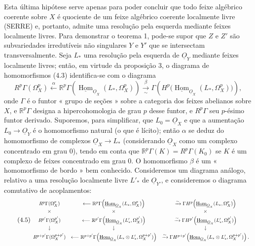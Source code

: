 \documentclass[11pt,twoside,openany]{book}
\numberwithin{equation}{section}
\newcommand{\Osh}{\underline{O}}
\newcommand{\Homsh}{\underline{\operatorname{Hom}}}
\theoremstyle{plain}
\theoremstyle{definition}
\theoremstyle{remark}
\begin{document}
Esta última hipótese serve apenas para poder concluir que todo
feixe algébrico coerente sobre $X$ é quociente de um feixe algébrico
coerente localmente livre (SERRE) e, portanto, admite uma resolução pela esquerda mediante
feixes localmente livres. Para demonstrar o teorema 1, pode-se supor que
$Z$ e $Z'$ são subvariedades irredutíveis não singulares $Y$ e $Y'$ que se
intersectam transversalmente. Seja $L_{*}$ uma resolução pela esquerda de $\Osh_Y$ mediante
feixes localmente livres; então, em virtude da proposição 3, o diagrama
de homomorfismos (4.3) identifica-se com o diagrama
\[
R^{p}\Gamma(\Omega_X^{p})
\xleftarrow{\alpha}
\mathbb R^{p}\Gamma\!\left(\Homsh_{\Osh_X}(L_{*},\Omega_X^{p})\right)
\xrightarrow[\sim]{\beta}
\Gamma\!\left(H^{p}\bigl(\Homsh_{\Osh_X}(L_{*},\Omega_X^{p})\bigr)\right),
\]
onde $\Gamma$ é o funtor « grupo de seções » sobre a categoria dos
feixes abelianos sobre $X$, e $\mathbb R^{p}\Gamma$ designa
a hipercohomologia de grau $p$ desse funtor, e $R^{p}\Gamma$ seu
$p$-ésimo funtor derivado. Suporemos, para simplificar, que $L_0=\Osh_X$ e que
a aumentação $L_0\longrightarrow\Osh_Y$ é o homomorfismo natural (o que
é lícito); então $\alpha$ se deduz do homomorfismo de complexos
$\Osh_X\longrightarrow L_{*}$ (considerando $\Osh_X$ como um complexo concentrado
em grau $0$), tendo em conta que $\mathbb R^{p}\Gamma(K)=R^{p}\Gamma(K_0)$ se $K$
é um complexo de feixes concentrado em grau $0$. O homomorfismo $\beta$ é um
« homomorfismo de bordo » bem conhecido. Consideremos um diagrama análogo, relativo a
uma resolução localmente livre $L'_{*}$ de $\Osh_{Y'}$, e consideremos o
diagrama comutativo de acoplamentos:
\begin{equation}\tag{4.5}
\resizebox{\textwidth}{!}{$
\begin{array}{ccc}
R^{p}\Gamma(\Omega_X^{p})
&\longleftarrow
\mathbb R^{p}\Gamma\!\left(\Homsh_{\Osh_X}(L_{*},\Omega_X^{p})\right)
&\xrightarrow{\sim}
\Gamma H^{p}\!\left(\Homsh_{\Osh_X}(L_{*},\Omega_X^{p})\right)
\\[3pt]
\times&\times&\times\\[3pt]
R^{p'}\Gamma(\Omega_X^{p'})
&\longleftarrow
\mathbb R^{p'}\Gamma\!\left(\Homsh_{\Osh_X}(L'_{*},\Omega_X^{p'})\right)
&\xrightarrow{\sim}
\Gamma H^{p'}\!\left(\Homsh_{\Osh_X}(L'_{*},\Omega_X^{p'})\right)
\\[3pt]
\downarrow&\downarrow&\downarrow\\[3pt]
R^{p+p'}\Gamma(\Omega_X^{p+p'})
&\longleftarrow
\mathbb R^{p+p'}\Gamma\!\left(
\Homsh_{\Osh_X}(L_{*}\otimes L'_{*},\Omega_X^{p+p'})\right)
&\xrightarrow{\sim}
\Gamma H^{p+p'}\!\left(
\Homsh_{\Osh_X}(L_{*}\otimes L'_{*},\Omega_X^{p+p'})\right).
\end{array}
$}
\end{equation}
\end{document}
